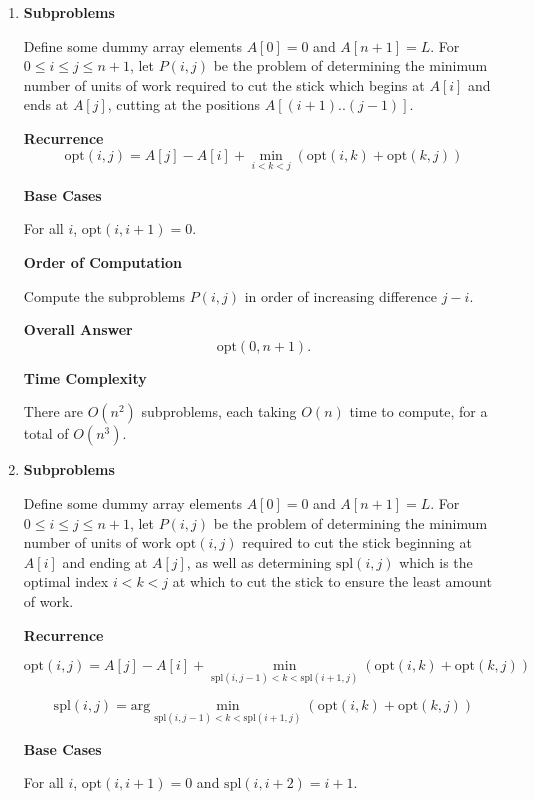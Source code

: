 \documentclass{article}
\begin{document}
\begin{solution}
\begin{enumerate}[label = (\alph*)]
    \item 

    \textbf{Subproblems}

    Define some dummy array elements $A[0] = 0$ and $A[n+1] = L$.
    For $0\leq i \leq j \leq n+1$, let $P(i, j)$ be the problem of determining the minimum number of units of work required 
    to cut the stick which begins at $A[i]$ and ends at $A[j]$, cutting at the positions $A[(i+1)..(j-1)]$.

    \textbf{Recurrence}
    $$
    \mathrm{opt}(i,j)=A[j] - A[i] + \min_{i<k<j}(\mathrm{opt}(i,k) + \mathrm{opt}(k,j))
    $$

    \textbf{Base Cases}

    For all $i$, $\mathrm{opt}(i, i+1) = 0$.

    \textbf{Order of Computation}

    Compute the subproblems $P(i,j)$ in order of increasing difference $j-i$.

    \textbf{Overall Answer}
    $$ \mathrm{opt}(0,n+1).$$

    \textbf{Time Complexity}

    There are $O(n^2)$ subproblems, each taking $O(n)$ time to compute, for a total of $O(n^3)$.

    \item 

    \textbf{Subproblems}

    Define some dummy array elements $A[0] = 0$ and $A[n+1] = L$.
    For $0\leq i \leq j \leq n+1$, let $P(i,j)$ be the problem of determining the 
    minimum number of units of work $\mathrm{opt}(i,j)$ required to cut the stick 
    beginning at $A[i]$ and ending at $A[j]$, as well as determining $\mathrm{spl}(i,j)$
    which is the optimal index $i < k < j$ at which to cut the stick to ensure the least 
    amount of work.

    \textbf{Recurrence}

    $$
    \mathrm{opt}(i,j)=A[j] - A[i] + \min_{\mathrm{spl}(i,j-1)<k<\mathrm{spl}(i+1,j)}(\mathrm{opt}(i,k) + \mathrm{opt}(k,j))
    $$

    $$
    \mathrm{spl}(i,j)= \mathrm{arg}\min_{\mathrm{spl}(i,j-1)<k<\mathrm{spl}(i+1,j)}(\mathrm{opt}(i,k) + \mathrm{opt}(k,j))
    $$


    \textbf{Base Cases}

    For all $i$, $\mathrm{opt}(i, i+1) = 0$ and $\mathrm{spl}(i, i+2) = i+1$.


\end{enumerate}
\end{solution}
\end{document}
